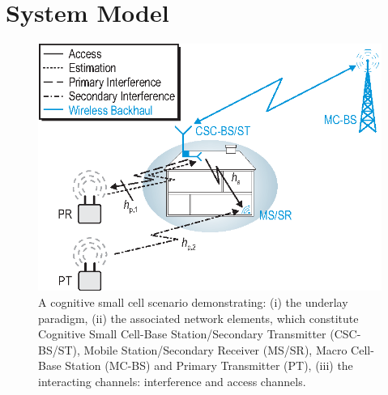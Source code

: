 \documentclass[letterpaper, twocolumn]{IEEEtran}
\newcommand{\figscalet}{0.7 \columnwidth}
\newcommand{\figscalet}{0.38 \columnwidth}
\begin{document}
\section{System Model} \label{sec:sys_mod}
\begin{figure}[!t]
\centering
\includegraphics[width = \figscalet]{figures/CR_Scenario_Underlay}
\caption{A cognitive small cell scenario demonstrating: (i) the underlay paradigm, (ii) the associated network elements, which constitute Cognitive Small Cell-Base Station/Secondary Transmitter (CSC-BS/ST), Mobile Station/Secondary Receiver (MS/SR), Macro Cell-Base Station (MC-BS) and Primary Transmitter (PT), (iii) the interacting channels: interference and access channels.}
\label{fig:scenario}
\end{figure}

\end{document}
